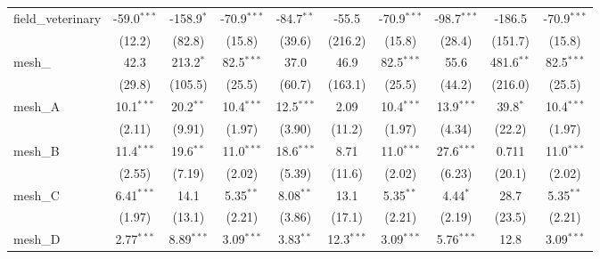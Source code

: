 \begin{tabular}{lccccccccc}
   field\_veterinary                                           & -59.0$^{***}$  & -158.9$^{*}$   & -70.9$^{***}$ & -84.7$^{**}$   & -55.5          & -70.9$^{***}$ & -98.7$^{***}$  & -186.5         & -70.9$^{***}$\\   
                                                               & (12.2)         & (82.8)         & (15.8)        & (39.6)         & (216.2)        & (15.8)        & (28.4)         & (151.7)        & (15.8)\\   
   mesh\_                                                      & 42.3           & 213.2$^{*}$    & 82.5$^{***}$  & 37.0           & 46.9           & 82.5$^{***}$  & 55.6           & 481.6$^{**}$   & 82.5$^{***}$\\   
                                                               & (29.8)         & (105.5)        & (25.5)        & (60.7)         & (163.1)        & (25.5)        & (44.2)         & (216.0)        & (25.5)\\   
   mesh\_A                                                     & 10.1$^{***}$   & 20.2$^{**}$    & 10.4$^{***}$  & 12.5$^{***}$   & 2.09           & 10.4$^{***}$  & 13.9$^{***}$   & 39.8$^{*}$     & 10.4$^{***}$\\   
                                                               & (2.11)         & (9.91)         & (1.97)        & (3.90)         & (11.2)         & (1.97)        & (4.34)         & (22.2)         & (1.97)\\   
   mesh\_B                                                     & 11.4$^{***}$   & 19.6$^{**}$    & 11.0$^{***}$  & 18.6$^{***}$   & 8.71           & 11.0$^{***}$  & 27.6$^{***}$   & 0.711          & 11.0$^{***}$\\   
                                                               & (2.55)         & (7.19)         & (2.02)        & (5.39)         & (11.6)         & (2.02)        & (6.23)         & (20.1)         & (2.02)\\   
   mesh\_C                                                     & 6.41$^{***}$   & 14.1           & 5.35$^{**}$   & 8.08$^{**}$    & 13.1           & 5.35$^{**}$   & 4.44$^{*}$     & 28.7           & 5.35$^{**}$\\   
                                                               & (1.97)         & (13.1)         & (2.21)        & (3.86)         & (17.1)         & (2.21)        & (2.19)         & (23.5)         & (2.21)\\   
   mesh\_D                                                     & 2.77$^{***}$   & 8.89$^{***}$   & 3.09$^{***}$  & 3.83$^{**}$    & 12.3$^{***}$   & 3.09$^{***}$  & 5.76$^{***}$   & 12.8           & 3.09$^{***}$\\   

\end{tabular}
